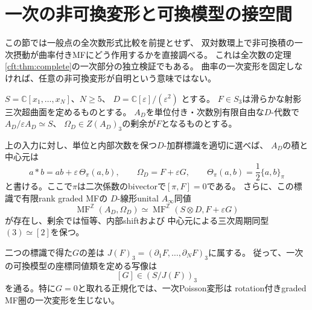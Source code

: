 \section{一次の非可換変形と可換模型の接空間}
\label{fpk:sec:first-order}

この節では一般点の全次数形式比較を前提とせず、
双対数環上で非可換積の一次摂動が曲率付きMFにどう作用するかを直接調べる。
これは全次数の定理\ref{cft:thm:complete}の一次部分の独立検証でもある。
曲率の一次変形を固定しなければ、任意の非可換変形が自明という意味ではない。

$S=\mathbb C[x_1,\ldots,x_N]$、$N\ge5$、
$D=\mathbb C[\varepsilon]/(\varepsilon^2)$ とする。
$F\in S_3$は滑らかな射影三次超曲面を定めるものとする。
$A_D$を単位付き・次数別有限自由な$D$-代数で
$A_D/\varepsilon A_D\simeq S$、
$\Omega_D\in Z(A_D)_3$の剰余が$F$となるものとする。

\begin{theorem}[一次Poisson方向の曲率付き消滅]
\label{fpk:thm:infinitesimal}
上の入力に対し、単位と内部次数を保つ$D$-加群標識を適切に選べば、
$A_D$の積と中心元は
\begin{equation}\label{fpk:eq:normal}
 a*b=ab+\varepsilon\,\Theta_\pi(a,b),\qquad
 \Omega_D=F+\varepsilon G,\qquad
 \Theta_\pi(a,b)=\frac12\{a,b\}_\pi
\end{equation}
と書ける。ここで$\pi$は二次係数のbivectorで$[\pi,F]=0$である。
さらに、この標識で有限rank graded MFの
$D$-線形unital $A_\infty$同値
\begin{equation}\label{fpk:eq:equivalence}
 \operatorname{MF}^{\mathbb Z}(A_D,\Omega_D)
 \simeq
 \operatorname{MF}^{\mathbb Z}(S\otimes D,F+\varepsilon G)
\end{equation}
が存在し、剰余では恒等、内部shiftおよび
中心元による三次周期同型$(3)\simeq[2]$を保つ。

二つの標識で得た$G$の差は
$J(F)_3=(\partial_1F,\ldots,\partial_NF)_3$に属する。
従って、一次の可換模型の座標同値類を定める写像は
\begin{equation}\label{fpk:eq:tangent}
 [G]\in(S/J(F))_3
\end{equation}
を通る。特に$G=0$と取れる正規化では、一次Poisson変形は
rotation付きgraded MF圏の一次変形を生じない。
\end{theorem}

